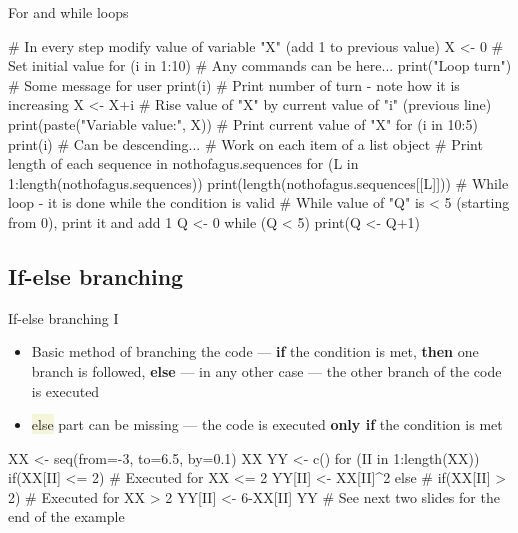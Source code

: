 \documentclass[compress, ucs, xelatex, 11pt, xcolor=svgnames, aspectratio=169,
	hyperref={
		bookmarks=true,
		unicode=true,
		colorlinks=true,
		pdftitle={Molecular data in R},
		plainpages=false,
		pdfauthor={Vojtech Zeisek},
		pdfsubject={Course about phylogeny and evolution in R},
		pdfcreator={XeLaTeX},
		pdfkeywords={R, evolution, phylogeny, molecular data},
		linkcolor=Crimson, %
		anchorcolor=Magenta, %
		citecolor=Magenta, %
		filecolor=Magenta, %
		menucolor=Magenta, %
		urlcolor=DodgerBlue, %
		pdftex},
	url={hyphens, lowtilde} %
	]{beamer}
\renewcommand{\texttt}[1]{\colorbox{Beige}{{\ttfamily #1}}}
\begin{document}
\begin{frame}[fragile]{For and while loops}
	\begin{spluscode}
    # In every step modify value of variable "X" (add 1 to previous value)
    X <- 0 # Set initial value
    for (i in 1:10) {
      # Any commands can be here...
      print("Loop turn") # Some message for user
      print(i) # Print number of turn - note how it is increasing
      X <- X+i # Rise value of "X" by current value of "i" (previous line)
      print(paste("Variable value:", X)) } # Print current value of "X"
    for (i in 10:5) { print(i) } # Can be descending...
    # Work on each item of a list object
    # Print length of each sequence in nothofagus.sequences
    for (L in 1:length(nothofagus.sequences)) {
      print(length(nothofagus.sequences[[L]])) }
    # While loop - it is done while the condition is valid
    # While value of "Q" is < 5 (starting from 0), print it and add 1
    Q <- 0
    while (Q < 5) { print(Q <- Q+1) }
	\end{spluscode}
\end{frame}

\subsection{If-else branching}

\begin{frame}[fragile]{If-else branching I}
	\begin{itemize}
		\item Basic method of branching the code --- \textbf{if} the condition is met, \textbf{then} one branch is followed, \textbf{else} --- in any other case --- the other branch of the code is executed
		\item \texttt{else} part can be missing --- the code is executed \textbf{only if} the condition is met
	\end{itemize}
	\begin{spluscode}
    XX <- seq(from=-3, to=6.5, by=0.1)
    XX
    YY <- c()
    for (II in 1:length(XX)) {
      if(XX[II] <= 2) { # Executed for XX <= 2
        YY[II] <- XX[II]^2
        } else { # if(XX[II] > 2) # Executed for XX > 2
          YY[II] <- 6-XX[II]
          }
      }
    YY # See next two slides for the end of the example
	\end{spluscode}
\end{frame}
\end{document}
